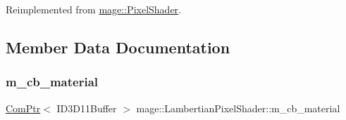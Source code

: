 Reimplemented from \hyperlink{classmage_1_1_pixel_shader_a3338707ee1f150e6d95e7c0b982d8aca}{mage\+::\+Pixel\+Shader}.



\subsection{Member Data Documentation}
\hypertarget{classmage_1_1_lambertian_pixel_shader_aff89982b5f85531515ec2316930b2944}{}\label{classmage_1_1_lambertian_pixel_shader_aff89982b5f85531515ec2316930b2944} 
\subsubsection{\texorpdfstring{m\+\_\+cb\+\_\+material}{m\_cb\_material}}
{\footnotesize\ttfamily \hyperlink{namespacemage_ae74f374780900893caa5555d1031fd79}{Com\+Ptr}$<$ I\+D3\+D11\+Buffer $>$ mage\+::\+Lambertian\+Pixel\+Shader\+::m\+\_\+cb\+\_\+material\hspace{0.3cm}{\ttfamily [private]}}

